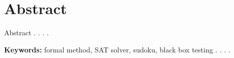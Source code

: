\chapter*{Abstract}

Abstract . . . .

\vspace{0.5 cm}
\begin{flushleft}
{\textbf{Keywords:} formal method, SAT solver, sudoku, black box testing . . . . }
\end{flushleft}